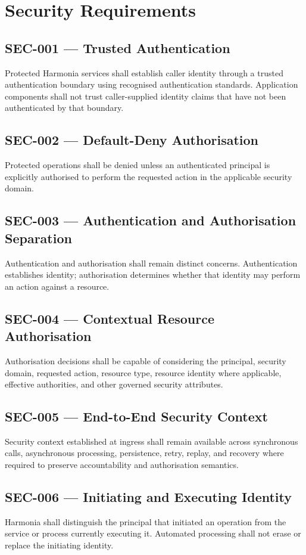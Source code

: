 \section{Security Requirements}

\subsection{SEC-001 --- Trusted Authentication}
Protected Harmonia services shall establish caller identity through a trusted authentication boundary using recognised authentication standards. Application components shall not trust caller-supplied identity claims that have not been authenticated by that boundary.

\subsection{SEC-002 --- Default-Deny Authorisation}
Protected operations shall be denied unless an authenticated principal is explicitly authorised to perform the requested action in the applicable security domain.

\subsection{SEC-003 --- Authentication and Authorisation Separation}
Authentication and authorisation shall remain distinct concerns. Authentication establishes identity; authorisation determines whether that identity may perform an action against a resource.

\subsection{SEC-004 --- Contextual Resource Authorisation}
Authorisation decisions shall be capable of considering the principal, security domain, requested action, resource type, resource identity where applicable, effective authorities, and other governed security attributes.

\subsection{SEC-005 --- End-to-End Security Context}
Security context established at ingress shall remain available across synchronous calls, asynchronous processing, persistence, retry, replay, and recovery where required to preserve accountability and authorisation semantics.

\subsection{SEC-006 --- Initiating and Executing Identity}
Harmonia shall distinguish the principal that initiated an operation from the service or process currently executing it. Automated processing shall not erase or replace the initiating identity.

